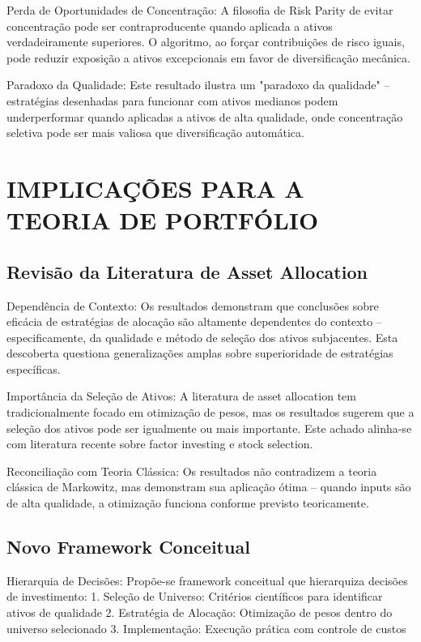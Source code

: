 Perda de Oportunidades de Concentração: A filosofia de Risk Parity de evitar concentração pode ser contraproducente quando aplicada a ativos verdadeiramente superiores. O algoritmo, ao forçar contribuições de risco iguais, pode reduzir exposição a ativos excepcionais em favor de diversificação mecânica.

Paradoxo da Qualidade: Este resultado ilustra um "paradoxo da qualidade" – estratégias desenhadas para funcionar com ativos medianos podem underperformar quando aplicadas a ativos de alta qualidade, onde concentração seletiva pode ser mais valiosa que diversificação automática.

\section{IMPLICAÇÕES PARA A TEORIA DE PORTFÓLIO}

\subsection{Revisão da Literatura de Asset Allocation}

Dependência de Contexto: Os resultados demonstram que conclusões sobre eficácia de estratégias de alocação são altamente dependentes do contexto – especificamente, da qualidade e método de seleção dos ativos subjacentes. Esta descoberta questiona generalizações amplas sobre superioridade de estratégias específicas.

Importância da Seleção de Ativos: A literatura de asset allocation tem tradicionalmente focado em otimização de pesos, mas os resultados sugerem que a seleção dos ativos pode ser igualmente ou mais importante. Este achado alinha-se com literatura recente sobre factor investing e stock selection.

Reconciliação com Teoria Clássica: Os resultados não contradizem a teoria clássica de Markowitz, mas demonstram sua aplicação ótima – quando inputs são de alta qualidade, a otimização funciona conforme previsto teoricamente.

\subsection{Novo Framework Conceitual}

Hierarquia de Decisões: Propõe-se framework conceitual que hierarquiza decisões de investimento:
1. Seleção de Universo: Critérios científicos para identificar ativos de qualidade
2. Estratégia de Alocação: Otimização de pesos dentro do universo selecionado
3. Implementação: Execução prática com controle de custos

